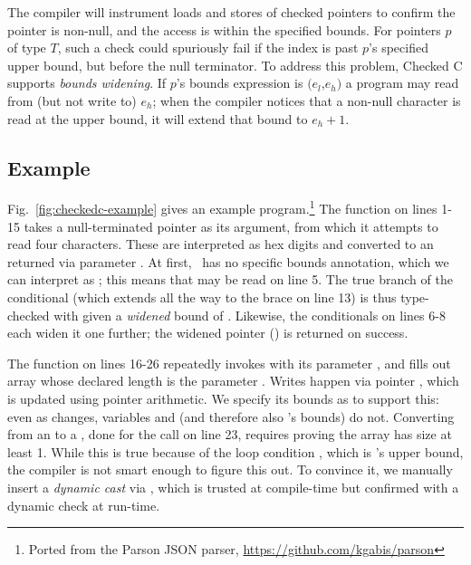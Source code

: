 The \checkedc compiler will instrument loads and stores of checked
pointers to confirm the pointer is non-null, and the access is within
the specified bounds. For pointers $p$ of type
$T$\code{>}, such a check could spuriously fail if
the index is past $p$'s specified upper bound, but before the null
terminator. To address this problem, Checked C supports \emph{bounds
  widening}.
If $p$'s bounds expression is $(e_l$,$e_h)$ a program may read from (but not
write to) $e_h$; when the compiler notices that a non-null character
is read at the upper bound, it will extend that bound to $e_h+1$.

\subsection{Example}
\label{sec:example}

Fig.~\ref{fig:checkedc-example} gives an example \checkedc
program.\footnote{Ported from the Parson JSON
parser, \url{https://github.com/kgabis/parson}} 
The function  on lines 1-15 takes a 
null-terminated pointer  as its argument, from which it attempts to read four
characters. These are interpreted as hex digits and converted to an
 returned via parameter . At first,
~has no specific bounds annotation, which we can interpret as
; this means that  may be read on line
5. The true branch of the conditional (which extends all the way to
the brace on line 13) is thus type-checked with  given a
\emph{widened} bound of . Likewise, the conditionals on
lines 6-8 each widen it one further; the widened pointer
() is returned on success.

The  function on lines 16-26 repeatedly invokes
 with its parameter , and fills out
array  whose declared length is the parameter . Writes
happen via pointer , which is updated using pointer
arithmetic. We specify its bounds as
 to support this: even as  changes, variables  and  (and therefore also 's bounds) do not. Converting from an
 to a , done for the call on
line 23, requires proving the array has size at least 1. While this is true
because of the loop condition , which is 's
upper bound,  the compiler is not smart enough to figure this
out. To convince it, we manually insert a \emph{dynamic cast} via
, which is trusted at compile-time but confirmed
with a dynamic check at run-time.


